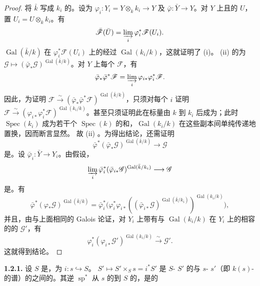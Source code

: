 \begin{proof}
将 $\bar k$ 写成 $k_i$ 的。设为 $\varphi_i:Y_i=Y\otimes_k k_i\to Y$ 及 $\bar\varphi:\bar Y\to Y$。对 $Y$ 上且的 $U$，置 $U_i=U\otimes_k k_i$。有
\[\bar{\mathscr F}(\bar U)=\varinjlim_i\varphi_i^*\mathscr F(U_i).\]
$\operatorname{Gal}(\bar k/k)$ 在 $\varphi_i^*\mathscr F(U_i)$ 上的经过 $\operatorname{Gal}(k_i/k)$，这就证明了 (i)。
 (ii) 的为 $\mathscr G\mapsto(\bar\varphi_*\mathscr G)^{\operatorname{Gal}(\bar k/k)}$。对 $Y$ 上每个 $\mathscr F$，有
\[\bar\varphi_*\bar\varphi^*\mathscr F=\varinjlim_i\varphi_{i*}\varphi_i^*\mathscr F.\]
因此，为证明 $\mathscr F\xrightarrow\sim(\bar\varphi_*\bar\varphi^*\mathscr F)^{\operatorname{Gal}(\bar k/k)}$，只须对每个 $i$ 证明
$\mathscr F\xrightarrow\sim(\varphi_{i*}\varphi_i^*\mathscr F)^{\operatorname{Gal}(k_i/k)}$。甚至只须证明此在标量由 $k$ 到 $k_i$ 后成为；此时 $\operatorname{Spec}(k_i)$ 成为若干个 $\operatorname{Spec}(k)$ 的和，$\operatorname{Gal}(k_i/k)$ 在这些副本间单纯传递地置换，因而断言显然。
故 (ii) 。为得出结论，还需证明
\[\bar\varphi^*(\bar\varphi_*\mathscr G)^{\operatorname{Gal}(\bar k/k)}\longrightarrow\mathscr G\]
是。设 $\bar\varphi_i:\bar Y\to Y_i$。由假设，
\[\varinjlim_i\bar\varphi_i^*(\bar\varphi_{i*}\mathscr G)^{\operatorname{Gal}(\bar k/k_i)}\longrightarrow\mathscr G\]
是。有
\[
\bar\varphi^*(\varphi_*\mathscr G)^{\operatorname{Gal}(\bar k/k)}
=\bar\varphi_i^*\bigl(\varphi_i^*\varphi_{i*}((\bar\varphi_{i*}\mathscr G)^{\operatorname{Gal}(\bar k/k_i)})^{\operatorname{Gal}(k_i/k)}\bigr),
\]
并且，由与上面相同的 Galois 论证，对 $Y_i$ 上带有与 $\operatorname{Gal}(k_i/k)$ 在 $Y_i$ 上的相容的的 $\mathscr G'$，有
\[\varphi_i^*(\varphi_{i*}\mathscr G')^{\operatorname{Gal}(k_i/k)}\xrightarrow\sim\mathscr G'.\]
这就得到结论。
\end{proof}
\textbf{1.2.1.} 设 $S$ 是，为 $i:s\hookrightarrow S$。 $S'\mapsto S'\times_Ss=i^*S'$ 是 $S$- $S'$ 的与 $s$- $s'$（即 $k(s)$-的谱）的之间的。其逆 $\operatorname{sp}^*$ 从 $s$ 的到 $S$ 的，是的
